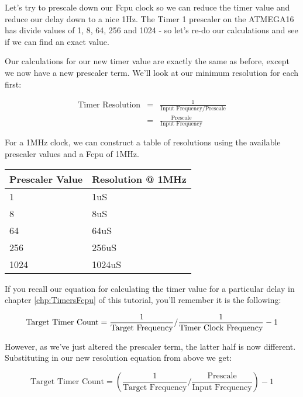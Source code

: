\documentclass[a4paper,oneside]{book}
\begin{document}
Let's try to prescale down our Fcpu clock so we can reduce the timer value and reduce our delay down to a nice 1Hz. The Timer 1 prescaler on the ATMEGA16 has divide values of 1, 8, 64, 256 and 1024 - so let's re-do our calculations and see if we can find an exact value.

Our calculations for our new timer value are exactly the same as before, except we now have a new prescaler term. We'll look at our minimum resolution for each first:

\begin{displaymath}
\begin{array}{rcl}
	\text{Timer Resolution} & = & \frac{1}{\text{Input Frequency} / \text{Prescale}} \\
	                        & = & \frac{\text{Prescale}}{\text{Input Frequency}}
\end{array}
\end{displaymath}

For a 1MHz clock, we can construct a table of resolutions using the available prescaler values and a Fcpu of 1MHz.

\begin{center}
\begin{tabular}{|l|l|}
	\hline
	Prescaler Value & Resolution @ 1MHz \\
	\hline
	1               & 1uS    \\
	8               & 8uS    \\
	64              & 64uS   \\
	256             & 256uS  \\
	1024            & 1024uS \\
	\hline
\end{tabular}
\end{center}

If you recall our equation for calculating the timer value for a particular delay in chapter \ref{chp:TimersFcpu} of this tutorial, you'll remember it is the following: 

\begin{displaymath}
\text{Target Timer Count} = \frac{1}{\text{Target Frequency}} / \frac{1}{\text{Timer Clock Frequency}} - 1 \\
\end{displaymath}

However, as we've just altered the prescaler term, the latter half is now different. Substituting in our new resolution equation from above we get: 

\begin{displaymath}
\text{Target Timer Count} = (\frac{1}{\text{Target Frequency}} / \frac{\text{Prescale}}{\text{Input Frequency}}) - 1 
\end{displaymath}
\end{document}
